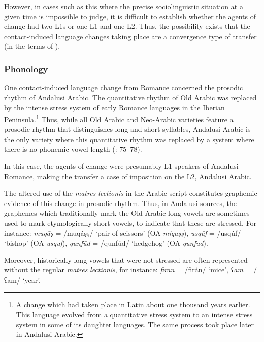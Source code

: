 \documentclass[output=paper,modfonts,nonflat]{langsci/langscibook}
\begin{document}
However, in cases such as this where the precise sociolinguistic situation at a given time is impossible to judge, it is difficult to establish whether the agents of change had two L1s or one L1 and one L2. Thus, the possibility exists that the contact-induced language changes taking place are a convergence type of transfer (in the terms of \citealt{Lucas2015}). 




\subsubsection{\label{bkm:Ref12959774}Phonology}




One contact-induced language change from Romance concerned the prosodic rhythm of Andalusi Arabic. The quantitative rhythm of Old Arabic was replaced by the intense stress system of early Romance languages in the Iberian Peninsula.\footnote{A change which had taken place in Latin about one thousand years earlier. This language evolved from a quantitative stress system to an intense stress system in some of its daughter languages. The same process took place later in Andalusi Arabic.} Thus, while all Old Arabic and Neo-Arabic varieties feature a prosodic rhythm that distinguishes long and short syllables, Andalusi Arabic is the only variety where this quantitative rhythm was replaced by a system where there is no phonemic vowel length (\citealt{Corriente1977,Corriente1992chapter,CorrientePereiraVicente2015}: 75–78).

In this case, the agents of change were presumably L1 speakers of Andalusi Romance, making the transfer a case of imposition on the L2, Andalusi Arabic. 

The altered use of the \textit{matres lectionis} in the Arabic script constitutes graphemic evidence of this change in prosodic rhythm. Thus, in Andalusi sources, the graphemes which traditionally mark the Old Arabic long vowels are sometimes used to mark etymologically short vowels, to indicate that these are stressed. For instance: {} \textit{{muqāṣ}} = /muqáṣṣ/ ‘pair of scissors’ (OA \textit{miqaṣṣ}), {} \textit{usqūf} = /usqúf/ ‘bishop’ (OA \textit{usquf}), {} \textit{qunfūd} = /qunfúd/ ‘hedgehog’ (OA \textit{qunfud}).  

Moreover, historically long vowels that were not stressed are often represented without the regular \textit{matres} \textit{lectionis}, for instance: {} \textit{firān} = /firán/ ‘mice’, {} \textit{ʕam} = /ʕam/ ‘year’.
\end{document}
